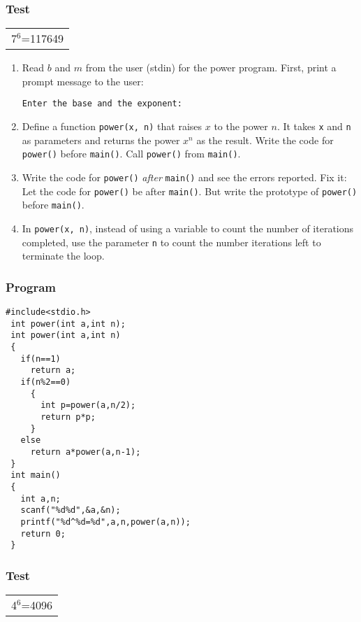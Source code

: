 \documentclass[11pt]{article}
\begin{document}
\subsubsection*{Test}
\label{sec-1-4-2}
\begin{center}
\begin{tabular}{l}
7$^{\text{6}}$=117649\\
\end{tabular}
\end{center}


\begin{enumerate}
\item Read $b$ and $m$ from the user (stdin) for the power
program. First, print a prompt message to the user:
\begin{verbatim}
Enter the base and the exponent:
\end{verbatim}

\item Define a function \texttt{power(x, n)} that raises $x$ to the power
$n$. It takes \texttt{x} and \texttt{n} as parameters and returns the power
$x^n$ as the result. Write the code for \texttt{power()} before
\texttt{main()}. Call \texttt{power()} from \texttt{main()}.
\item Write the code for \texttt{power()} \emph{after} \texttt{main()} and see the errors
reported. Fix it: Let the code for \texttt{power()} be after
\texttt{main()}. But write the prototype of \texttt{power()} before \texttt{main()}.
\item In \texttt{power(x, n)}, instead of using a variable to count the
number of iterations completed, use the parameter \texttt{n} to count
the number iterations left to terminate the loop.
\end{enumerate}
\subsubsection*{Program}
\label{sec-1-4-3}
\begin{verbatim}
#include<stdio.h>
 int power(int a,int n);
 int power(int a,int n)
 {
   if(n==1)
     return a;
   if(n%2==0)
     {
       int p=power(a,n/2);
       return p*p;
     }
   else
     return a*power(a,n-1);
 }
 int main()
 {
   int a,n;
   scanf("%d%d",&a,&n);
   printf("%d^%d=%d",a,n,power(a,n));
   return 0;
 }
\end{verbatim}
\subsubsection*{Test}
\label{sec-1-4-4}
\begin{center}
\begin{tabular}{l}
4$^{\text{6}}$=4096\\
\end{tabular}
\end{center}
\end{document}
